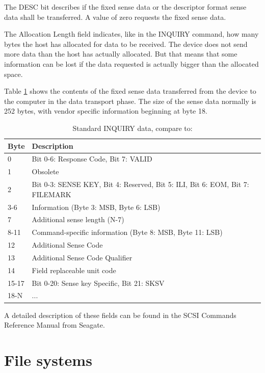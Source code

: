 \newpage

The DESC bit describes if the fixed sense data or the descriptor format sense data shall be transferred. A value of zero requests the fixed sense data\cite{scsi_seagate}.

The Allocation Length field indicates, like in the INQUIRY command, how many bytes the host has allocated for data to be received. The device does not send more data than the host has actually allocated. But that means that some information can be lost if the data requested is actually bigger than the allocated space.

Table \ref{table:sense_data} shows the contents of the fixed sense data transferred from the device to the computer in the data transport phase. The size of the sense data normally is 252 bytes, with vendor specific information beginning at byte 18.

\begin{table}[ht]
\caption{Standard INQUIRY data, compare to: \cite{usb_ms_jan, scsi_seagate}}
\centering
\begin{tabular}{|l|l|}
\hline\hline
\textbf{Byte} & \textbf{Description}\\ \hline
0 & Bit 0-6: Response Code, Bit 7: VALID \\ \hline
1 & Obsolete \\ \hline
2 & Bit 0-3: SENSE KEY, Bit 4: Reserved, Bit 5: ILI, Bit 6: EOM, Bit 7:  FILEMARK \\ \hline
3-6 & Information (Byte 3: MSB, Byte 6: LSB) \\ \hline
7 & Additional sense length (N-7) \\ \hline
8-11 & Command-specific information (Byte 8: MSB, Byte 11: LSB) \\ \hline
12 & Additional Sense Code \\ \hline
13 & Additional Sense Code Qualifier \\ \hline
14 & Field replaceable unit code \\ \hline
15-17 & Bit 0-20: Sense key Specific, Bit 21: SKSV \\ \hline
18-N & ... \\ \hline
\end{tabular}
\label{table:sense_data}
\end{table}

A detailed description of these fields can be found in the SCSI Commands Reference Manual from Seagate\cite{scsi_seagate}.

\chapter{File systems}

